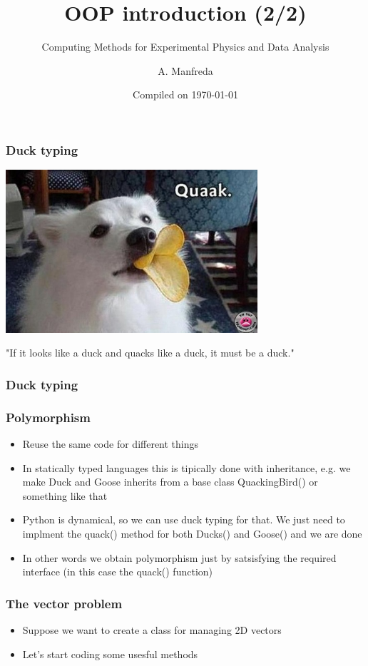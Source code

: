 \documentclass[9pt]{beamer}
\title{OOP introduction (2/2)}
\subtitle{Computing Methods for Experimental Physics and Data Analysis}
\date{Compiled on \today}
\author{A. Manfreda}
\institute[INFN]{INFN--Pisa}
\begin{document}
\titleframe


\begin{frame}
  \frametitle{Duck typing}
  
  \centering
  \includegraphics[width=0.7\textwidth]{quack.png}  
  
  \bigskip
  
  \centering
  "If it looks like a duck and quacks like a duck, it must be a duck."
  
\end{frame}


\begin{frame}
  \frametitle{Duck typing}
  
\end{frame}


\begin{frame}
  \frametitle{Polymorphism}
  
  \begin{itemize}
    \item Reuse the same code for different things
    \medskip
    \item In statically typed languages this is tipically done with inheritance,
          e.g. we make Duck and Goose inherits from a base class QuackingBird()
          or something like that
    \medskip
    \item Python is dynamical, so we can use duck typing for that.
          We just need to implment the quack() method for both Ducks() and Goose() 
          and we are done
    \medskip
    \item In other words we obtain polymorphism just by satsisfying the required \alert{interface}
          (in this case the quack() function)
  \end{itemize}
  
\end{frame}


\begin{frame}
  \frametitle{The vector problem}
  
  \begin{itemize}
    \item Suppose we want to create a class for managing 2D vectors
    \bigskip
    \item Let's start coding some usesful methods
  \end{itemize}
  
\end{frame}
\end{document}
